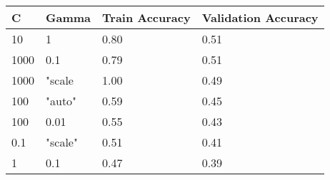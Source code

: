 \def\arraystretch{1.25}
\begin{center}
\begin{longtable}{l l l l}
\hline
\hline
\textbf{C} & \textbf{Gamma} & \textbf{Train Accuracy} & \textbf{Validation Accuracy}\\
\hline
\hline
10 & 1 & 0.80 & 0.51  \\
1000 & 0.1 & 0.79 & 0.51  \\
1000 & "scale & 1.00 & 0.49 \\
100 & "auto" & 0.59 & 0.45 \\
100 & 0.01 & 0.55 & 0.43 \\
0.1 & "scale" & 0.51 & 0.41 \\
1 & 0.1 & 0.47 & 0.39 \\ 
\hline
\end{longtable}
\setcounter{table}{3}
\end{center}